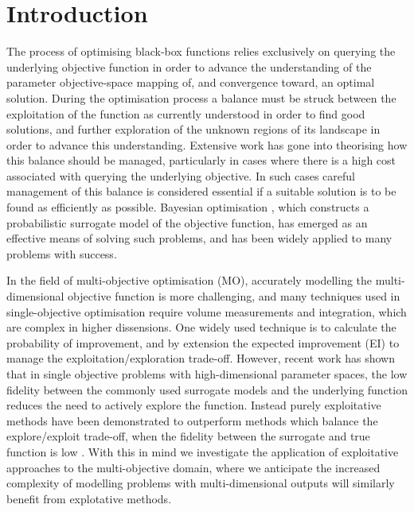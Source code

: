 \documentclass[conference]{IEEEtran}
\newcommand\ei{EI\xspace}
\begin{document}
\section{Introduction}
The process of optimising black-box functions relies exclusively on querying the underlying objective function in order to advance the understanding of the parameter objective-space mapping of, and convergence toward, an optimal solution. During the optimisation process a balance must be struck between the exploitation of the function as currently understood in order to find good solutions, and further exploration of the unknown regions of its landscape in order to advance this understanding. Extensive work has gone into theorising how this balance should be managed, particularly in cases where there is a high cost associated with querying the underlying objective. In such cases careful management of this balance is considered essential if a suitable solution is to be found as efficiently as possible. Bayesian optimisation \cite{jones1998efficient}, which constructs a probabilistic surrogate model of the objective function, has emerged as an effective means of solving such problems, and has been widely applied to many problems with success.

In the field of multi-objective optimisation (MO), accurately modelling the multi-dimensional objective function is more challenging, and many techniques used in single-objective optimisation require volume measurements and integration, which are complex in higher dissensions. One widely used technique is to calculate the probability of improvement, and by extension the expected improvement (\ei) \cite{jones1998efficient} to manage the exploitation/exploration trade-off. However, recent work has shown that in single objective problems with high-dimensional parameter spaces, the low fidelity between the commonly used surrogate models and the underlying function reduces the need to actively explore the function. Instead purely exploitative methods have been demonstrated to outperform methods which balance the explore/exploit trade-off, when the fidelity between the surrogate and true function is low \cite{death2019greed}. With this in mind we investigate the application of exploitative approaches to the multi-objective domain, where we anticipate the increased complexity of modelling problems with multi-dimensional outputs will similarly benefit from explotative methods. 
\end{document}
